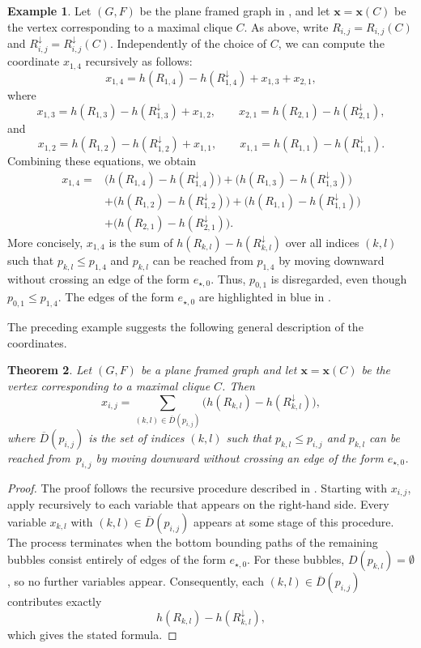 \documentclass[12pt, reqno]{amsart}
\theoremstyle{plain}
\newtheorem{theorem}{Theorem}[section]
\theoremstyle{definition}
\newtheorem{example}[theorem]{Example}
\numberwithin{equation}{section}
\begin{document}
\begin{example}\label{ex_coordinates_recursion}
Let $(G,F)$ be the plane framed graph in , and let $\mathbf{x}=\mathbf{x}(C)$ be the vertex corresponding to a maximal clique $C$. As above, write $R_{i,j}=R_{i,j}(C)$ and $R_{i,j}^{\downarrow}=R_{i,j}^{\downarrow}(C)$. Independently of the choice of $C$, we can compute the coordinate $x_{1,4}$ recursively as follows:
\[
x_{1,4}
= h(R_{1,4})-h(R_{1,4}^{\downarrow}) + x_{1,3}+x_{2,1},
\]
where
\[
x_{1,3}
= h(R_{1,3})-h(R_{1,3}^{\downarrow}) + x_{1,2},
\qquad
x_{2,1}
= h(R_{2,1})-h(R_{2,1}^{\downarrow}),
\]
and
\[
x_{1,2}
= h(R_{1,2})-h(R_{1,2}^{\downarrow}) + x_{1,1},
\qquad
x_{1,1}
= h(R_{1,1})-h(R_{1,1}^{\downarrow}).
\]
Combining these equations, we obtain
\[
\begin{aligned}
x_{1,4}
={}&\bigl(h(R_{1,4})-h(R_{1,4}^{\downarrow})\bigr)
+\bigl(h(R_{1,3})-h(R_{1,3}^{\downarrow})\bigr)\\
&+\bigl(h(R_{1,2})-h(R_{1,2}^{\downarrow})\bigr)
+\bigl(h(R_{1,1})-h(R_{1,1}^{\downarrow})\bigr)\\
&+\bigl(h(R_{2,1})-h(R_{2,1}^{\downarrow})\bigr).
\end{aligned}
\]
More concisely, $x_{1,4}$ is the sum of $h(R_{k,l})-h(R_{k,l}^{\downarrow})$ over all indices $(k,l)$ such that $p_{k,l}\leq p_{1,4}$ and $p_{k,l}$ can be reached from $p_{1,4}$ by moving downward without crossing an edge of the form $e_{\star,0}$. Thus, $p_{0,1}$ is disregarded, even though $p_{0,1}\leq p_{1,4}$. The edges of the form $e_{\star,0}$ are highlighted in blue in .
\end{example}

The preceding example suggests the following general description of the coordinates.

\begin{theorem}\label{thm_vertex_coordinates}
Let $(G,F)$ be a plane framed graph and let $\mathbf{x}=\mathbf{x}(C)$ be the vertex corresponding to a maximal clique $C$. Then
\[
x_{i,j}
=
\sum_{(k,l)\in\overline{D}(p_{i,j})}
\bigl(h(R_{k,l})-h(R_{k,l}^{\downarrow})\bigr),
\]
where $\overline{D}(p_{i,j})$ is the set of indices $(k,l)$ such that $p_{k,l}\leq p_{i,j}$ and $p_{k,l}$ can be reached from~$p_{i,j}$ by moving downward without crossing an edge of the form $e_{\star,0}$.
\end{theorem}

\begin{proof}
The proof follows the recursive procedure described in . Starting with $x_{i,j}$, apply  recursively to each variable that appears on the right-hand side. Every variable $x_{k,l}$ with $(k,l)\in\overline{D}(p_{i,j})$ appears at some stage of this procedure. The process terminates when the bottom bounding paths of the remaining bubbles consist entirely of edges of the form $e_{\star,0}$. For these bubbles, $D(p_{k,l})=\emptyset$, so no further variables appear. Consequently, each $(k,l)\in\overline{D}(p_{i,j})$ contributes exactly
\[
h(R_{k,l})-h(R_{k,l}^{\downarrow}),
\]
which gives the stated formula.
\end{proof}
\end{document}
